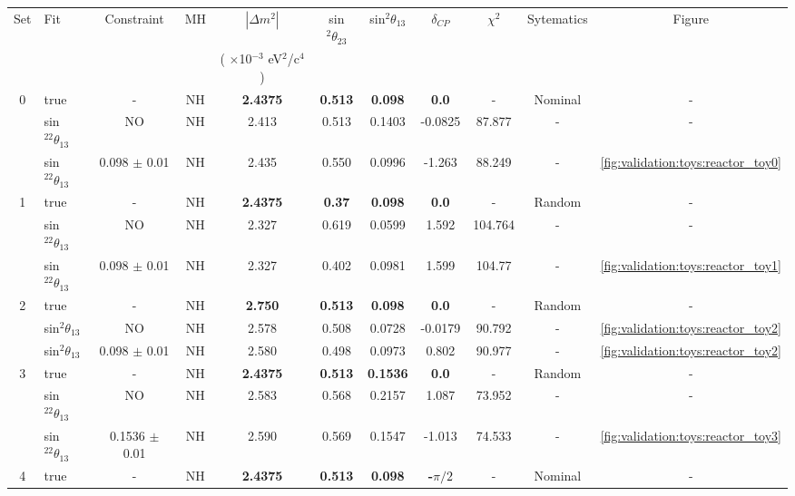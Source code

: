 \begin{table}[htb]
\small
\begin{center}
\begin{tabular}{@{}| c | l | c | c | c  c  c  c| c | c | c |@{}}
\hline
Set & Fit  & Constraint &  MH & $|\Delta m^2|$  & sin$^2\theta_{23}$ & sin$^2\theta_{13}$  & $\delta_{CP}$ &  $\chi^{2}$ & Sytematics & Figure  \\
 &   &  &  & ( $\times$10$^{-3}$ eV$^{2}$/c$^{4}$) &  &   &  &   &  & \\
\hline
0  & true  & - & NH & {\bf 2.4375 }   & {\bf 0.513}   & {\bf 0.098}   & {\bf 0.0} &  - & Nominal & - \\
   &  sin$^22\theta_{13}$ &   NO & NH  & 2.413          & 0.513      & 0.1403      & -0.0825  & 87.877  & - & - \\
	&  sin$^22\theta_{13}$ &   0.098 $\pm$ 0.01 & NH  & 2.435          & 0.550      & 0.0996      & -1.263   & 88.249  & - &  \ref{fig:validation:toys:reactor_toy0}\\
\hline
1  & true  & - & NH & {\bf 2.4375 }   & {\bf 0.37}   & {\bf 0.098}   & {\bf 0.0} &  - & Random & - \\
 & sin$^22\theta_{13}$ & NO  & NH  & 2.327          & 0.619      & 0.0599      & 1.592   & 104.764  & - & -\\ 
  & sin$^22\theta_{13}$ & 0.098 $\pm$ 0.01  & NH  & 2.327          & 0.402     & 0.0981      & 1.599   & 104.77  & - & \ref{fig:validation:toys:reactor_toy1}\\
\hline
2 & true  &  - & NH & {\bf 2.750 }   & {\bf 0.513}   & {\bf 0.098}   & {\bf 0.0}  &  - & Random & - \\
& sin$^2\theta_{13}$ & NO & NH  & 2.578          & 0.508      & 0.0728      & -0.0179   & 90.792  & - & \ref{fig:validation:toys:reactor_toy2}\\  
 & sin$^2\theta_{13}$ & 0.098 $\pm$ 0.01 & NH  & 2.580          & 0.498      & 0.0973      & 0.802   & 90.977  & - & \ref{fig:validation:toys:reactor_toy2}\\
\hline
3  & true  & - & NH & {\bf 2.4375 }   & {\bf 0.513}   & {\bf 0.1536}   & {\bf 0.0}  &  - & Random & - \\
& sin$^22\theta_{13}$ & NO & NH  & 2.583          & 0.568      & 0.2157      & 1.087   & 73.952  & - & - \\ 
 & sin$^22\theta_{13}$ & 0.1536 $\pm$ 0.01 & NH  & 2.590          & 0.569      & 0.1547     & -1.013   & 74.533  & - &  \ref{fig:validation:toys:reactor_toy3}\\
\hline
4  & true & - & NH & {\bf 2.4375 }   & {\bf 0.513}   & {\bf 0.098}   & {\bf -$\pi/2$}  &  - & Nominal & - \\

\end{tabular}
\end{center}
\end{table}
